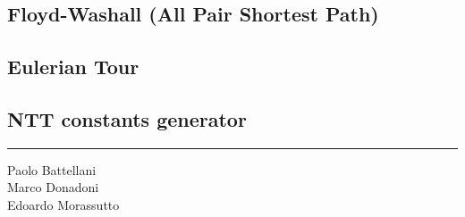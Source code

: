 \documentclass[9pt]{extarticle}
\begin{document}
\begin{multicols*}{3}
\subsection{Floyd-Washall (All Pair Shortest Path)}


\subsection{Eulerian Tour}


\subsection{NTT constants generator}


\noindent\rule{9cm}{0.3pt}

Paolo Battellani \\
Marco Donadoni \\
Edoardo Morassutto

\end{multicols*}
\end{document}

